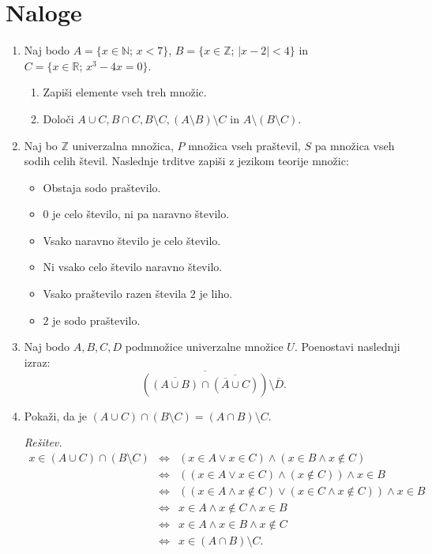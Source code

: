 \documentclass[11pt,paper=b5,DIV=13,headinclude,footinclude]{scrbook}
\begin{document}
\section{Naloge}
\begin{enumerate}
\item {\color{blue}Naj bodo $A = \{x \in \mathbb{N};\,x < 7\}$,
$B = \{x \in \mathbb{Z};\,|x - 2| < 4\}$ in
$C = \{x \in\mathbb{R};\,x^3 - 4x = 0\}$.}
\begin{enumerate}
\item {\color{blue}Zapiši elemente vseh treh množic.}
\item {\color{blue}Določi $A \cup C, B \cap C, B \setminus C,
(A \setminus B) \setminus C$ in $A \setminus (B \setminus C)$.}
\end{enumerate}

\item {\color{blue}Naj bo $\mathbb{Z}$ univerzalna množica, $P$ množica vseh
praštevil, $S$ pa množica vseh sodih celih števil. Naslednje trditve zapiši
z jezikom teorije množic:}
\begin{itemize}
\item[(i)] {\color{blue}Obstaja sodo praštevilo.} 
\item[(ii)] {\color{blue}$0$ je celo število, ni pa naravno število.} 
\item[(iii)] {\color{blue}Vsako naravno število je celo število.} 
\item[(iv)] {\color{blue}Ni vsako celo število naravno število.} 
\item[(v)] {\color{blue}Vsako praštevilo razen števila $2$ je liho.} 
\item[(vi)] {\color{blue}$2$ je sodo praštevilo.} \quad [$2\in S\cap P$]
\end{itemize}

\item {\color{blue}Naj bodo $A,B,C,D$ podmnožice univerzalne množice $U$.
Poenostavi naslednji izraz:}
$$\overline{(\overline{(A\cup B)} \cap \overline{(\overline{A} \cup C)})}\setminus \overline{D}.$$

\item {\color{blue}Pokaži, da je
$(A\cup C)\cap (B\setminus C) = (A\cap B)\setminus C$.}

\emph{Rešitev.}
\begin{eqnarray*}
x\in (A\cup C)\cap (B\setminus C) &\Leftrightarrow & (x\in A \vee x\in C) \wedge (x\in B \wedge x\notin C)\\
 &\Leftrightarrow & ((x\in A \vee x\in C) \wedge (x\notin C))\wedge x\in B\\
&\Leftrightarrow & ((x\in A \wedge x\notin C) \vee (x\in C \wedge x\notin C)) \wedge x\in B\\
&\Leftrightarrow & x\in A \wedge x\notin C  \wedge x\in B\\
&\Leftrightarrow & x\in A \wedge x\in B  \wedge x\notin C \\
&\Leftrightarrow & x \in (A\cap B)\setminus C. 
\end{eqnarray*}


\end{enumerate}
\end{document}
